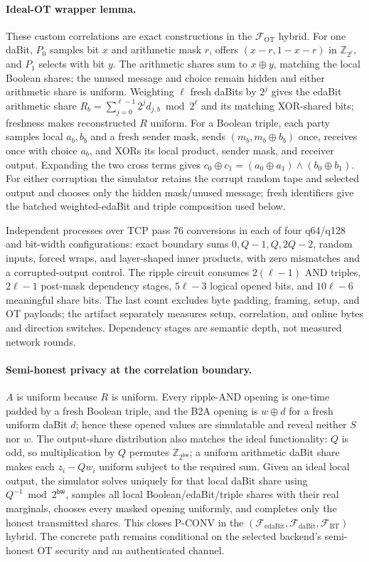 \documentclass[11pt]{article}
\newcommand{\Z}{\mathbb{Z}}
\newcommand{\bw}{\mathsf{bw}}
\newcommand{\Q}{Q}   %
\begin{document}
\paragraph{Ideal-OT wrapper lemma.}
These custom correlations are exact constructions in the
$\mathcal F_{\mathrm{OT}}$ hybrid. For one daBit, $P_0$ samples bit $x$ and
arithmetic mask $r$, offers $(x-r,1-x-r)$ in $\Z_{2^\ell}$, and $P_1$ selects
with bit $y$. The arithmetic shares sum to $x\oplus y$, matching the local
Boolean shares; the unused message and choice remain hidden and either
arithmetic share is uniform. Weighting $\ell$ fresh daBits by $2^j$ gives the
edaBit arithmetic share
$R_b=\sum_{j=0}^{\ell-1}2^j d_{j,b}\bmod2^\ell$ and its matching XOR-shared
bits; freshness makes reconstructed $R$ uniform. For a Boolean triple, each
party samples local $a_b,b_b$ and a fresh sender mask, sends
$(m_b,m_b\oplus b_b)$ once, receives once with choice $a_b$, and XORs its
local product, sender mask, and receiver output. Expanding the two cross terms
gives $c_0\oplus c_1=(a_0\oplus a_1)\wedge(b_0\oplus b_1)$. For either
corruption the simulator retains the corrupt random tape and selected output
and chooses only the hidden mask/unused message; fresh identifiers give the
batched weighted-edaBit and triple composition used below.


Independent processes over TCP pass 76 conversions in each of four q64/q128
and bit-width configurations: exact boundary sums
$0,\Q-1,\Q,2\Q-2$, random inputs, forced wraps, and layer-shaped inner
products, with zero mismatches and a corrupted-output control. The ripple
circuit consumes $2(\ell-1)$ AND triples, $2\ell-1$ post-mask dependency
stages, $5\ell-3$ logical opened bits, and $10\ell-6$ meaningful share bits.
The last count excludes byte padding, framing, setup, and OT payloads; the
artifact separately measures setup, correlation, and online bytes and
direction switches. Dependency stages are semantic depth, not measured
network rounds.

\paragraph{Semi-honest privacy at the correlation boundary.}
$A$ is uniform because $R$ is uniform. Every ripple-AND opening is one-time
padded by a fresh Boolean triple, and the B2A opening is $w\oplus d$ for a
fresh uniform daBit $d$; hence these opened values are simulatable and reveal
neither $S$ nor $w$. The output-share distribution also matches the ideal
functionality: $\Q$ is odd, so multiplication by $\Q$ permutes
$\Z_{2^\bw}$; a uniform arithmetic daBit share makes each
$z_i-\Q w_i$ uniform subject to the required sum. Given an ideal local output,
the simulator solves uniquely for that local daBit share using
$\Q^{-1}\bmod2^\bw$, samples all local Boolean/edaBit/triple shares with their
real marginals, chooses every masked opening uniformly, and completes only the
honest transmitted shares. This closes P-CONV in the
$(\mathcal F_{\mathrm{edaBit}},\mathcal F_{\mathrm{daBit}},
\mathcal F_{\mathrm{BT}})$ hybrid. The concrete path remains conditional on
the selected backend's semi-honest OT security and an authenticated channel.
\end{document}
